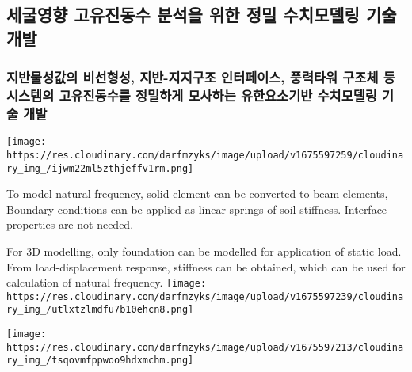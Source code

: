 \documentclass[
  letterpaper,
  DIV=11,
  numbers=noendperiod]{scrreprt}
\begin{document}
\hypertarget{uxc138uxad74uxc601uxd5a5-uxace0uxc720uxc9c4uxb3d9uxc218-uxbd84uxc11duxc744-uxc704uxd55c-uxc815uxbc00-uxc218uxce58uxbaa8uxb378uxb9c1-uxae30uxc220-uxac1cuxbc1c}{%
\subsection{세굴영향 고유진동수 분석을 위한 정밀 수치모델링 기술
개발}\label{uxc138uxad74uxc601uxd5a5-uxace0uxc720uxc9c4uxb3d9uxc218-uxbd84uxc11duxc744-uxc704uxd55c-uxc815uxbc00-uxc218uxce58uxbaa8uxb378uxb9c1-uxae30uxc220-uxac1cuxbc1c}}

\hypertarget{uxc9c0uxbc18uxbb3cuxc131uxac12uxc758-uxbe44uxc120uxd615uxc131-uxc9c0uxbc18-uxc9c0uxc9c0uxad6cuxc870-uxc778uxd130uxd398uxc774uxc2a4-uxd48duxb825uxd0c0uxc6cc-uxad6cuxc870uxccb4-uxb4f1-uxc2dcuxc2a4uxd15cuxc758-uxace0uxc720uxc9c4uxb3d9uxc218uxb97c-uxc815uxbc00uxd558uxac8c-uxbaa8uxc0acuxd558uxb294-uxc720uxd55cuxc694uxc18cuxae30uxbc18-uxc218uxce58uxbaa8uxb378uxb9c1-uxae30uxc220-uxac1cuxbc1c}{%
\subsubsection{지반물성값의 비선형성, 지반-지지구조 인터페이스, 풍력타워
구조체 등 시스템의 고유진동수를 정밀하게 모사하는 유한요소기반
수치모델링 기술
개발}\label{uxc9c0uxbc18uxbb3cuxc131uxac12uxc758-uxbe44uxc120uxd615uxc131-uxc9c0uxbc18-uxc9c0uxc9c0uxad6cuxc870-uxc778uxd130uxd398uxc774uxc2a4-uxd48duxb825uxd0c0uxc6cc-uxad6cuxc870uxccb4-uxb4f1-uxc2dcuxc2a4uxd15cuxc758-uxace0uxc720uxc9c4uxb3d9uxc218uxb97c-uxc815uxbc00uxd558uxac8c-uxbaa8uxc0acuxd558uxb294-uxc720uxd55cuxc694uxc18cuxae30uxbc18-uxc218uxce58uxbaa8uxb378uxb9c1-uxae30uxc220-uxac1cuxbc1c}}

\texttt{[image: https://res.cloudinary.com/darfmzyks/image/upload/v1675597259/cloudinary\_img\_/ijwm22ml5zthjeffv1rm.png]}

To model natural frequency, solid element can be converted to beam
elements, Boundary conditions can be applied as linear springs of soil
stiffness. Interface properties are not needed.

For 3D modelling, only foundation can be modelled for application of
static load. From load-displacement response, stiffness can be obtained,
which can be used for calculation of natural frequency.
\texttt{[image: https://res.cloudinary.com/darfmzyks/image/upload/v1675597239/cloudinary\_img\_/utlxtzlmdfu7b10ehcn8.png]}

\texttt{[image: https://res.cloudinary.com/darfmzyks/image/upload/v1675597213/cloudinary\_img\_/tsqovmfppwoo9hdxmchm.png]}
\end{document}
